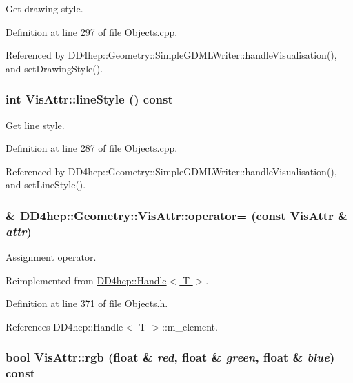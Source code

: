 Get drawing style. 

Definition at line 297 of file Objects.cpp.

Referenced by DD4hep::Geometry::SimpleGDMLWriter::handleVisualisation(), and setDrawingStyle().\hypertarget{class_d_d4hep_1_1_geometry_1_1_vis_attr_a2fe1437a3f88a7e0629058a5d57cc046}{
\subsubsection[{lineStyle}]{\setlength{\rightskip}{0pt plus 5cm}int VisAttr::lineStyle () const}}
\label{class_d_d4hep_1_1_geometry_1_1_vis_attr_a2fe1437a3f88a7e0629058a5d57cc046}


Get line style. 

Definition at line 287 of file Objects.cpp.

Referenced by DD4hep::Geometry::SimpleGDMLWriter::handleVisualisation(), and setLineStyle().\hypertarget{class_d_d4hep_1_1_geometry_1_1_vis_attr_a02a672b6dc4e30bb7208960a7a54f2ac}{
\subsubsection[{operator=}]{\& DD4hep::Geometry::VisAttr::operator= (const {\bf VisAttr} \& {\em attr})}}
\label{class_d_d4hep_1_1_geometry_1_1_vis_attr_a02a672b6dc4e30bb7208960a7a54f2ac}


Assignment operator. 

Reimplemented from \hyperlink{class_d_d4hep_1_1_handle_a9bbf8f498df42e81ad26fb00233505a6}{DD4hep::Handle$<$ T $>$}.

Definition at line 371 of file Objects.h.

References DD4hep::Handle$<$ T $>$::m\_\-element.\hypertarget{class_d_d4hep_1_1_geometry_1_1_vis_attr_a8480e8b84abfc922aff11be462dd3746}{
\subsubsection[{rgb}]{\setlength{\rightskip}{0pt plus 5cm}bool VisAttr::rgb (float \& {\em red}, \/  float \& {\em green}, \/  float \& {\em blue}) const}}
\label{class_d_d4hep_1_1_geometry_1_1_vis_attr_a8480e8b84abfc922aff11be462dd3746}


